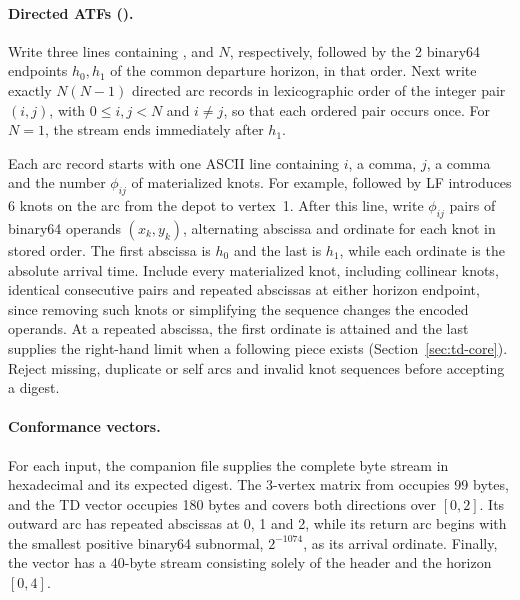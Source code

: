 \paragraph{Directed ATFs ().}
Write three lines containing ,  and $N$, respectively, followed by the 2 binary64 endpoints $h_0,h_1$ of the common departure horizon, in that order. Next write exactly $N(N-1)$ directed arc records in lexicographic order of the integer pair $(i,j)$, with $0\leq i,j<N$ and $i\ne j$, so that each ordered pair occurs once. For $N=1$, the stream ends immediately after $h_1$.

Each arc record starts with one ASCII line containing $i$, a comma, $j$, a comma and the number $\phi_{ij}$ of materialized knots. For example,  followed by LF introduces 6 knots on the arc from the depot to vertex~1. After this line, write $\phi_{ij}$ pairs of binary64 operands $(x_k,y_k)$, alternating abscissa and ordinate for each knot in stored order. The first abscissa is $h_0$ and the last is $h_1$, while each ordinate is the absolute arrival time. Include every materialized knot, including collinear knots, identical consecutive pairs and repeated abscissas at either horizon endpoint, since removing such knots or simplifying the sequence changes the encoded operands. At a repeated abscissa, the first ordinate is attained and the last supplies the right-hand limit when a following piece exists (Section~\ref{sec:td-core}). Reject missing, duplicate or self arcs and invalid knot sequences before accepting a digest.

\paragraph{Conformance vectors.}
For each input, the companion file  supplies the complete byte stream in hexadecimal and its expected digest. The 3-vertex matrix from  occupies 99 bytes, and the TD vector  occupies 180 bytes and covers both directions over $[0,2]$. Its outward arc has repeated abscissas at 0, 1 and 2, while its return arc begins with the smallest positive binary64 subnormal, $2^{-1074}$, as its arrival ordinate. Finally, the  vector has a 40-byte stream consisting solely of the header and the horizon $[0,4]$.
